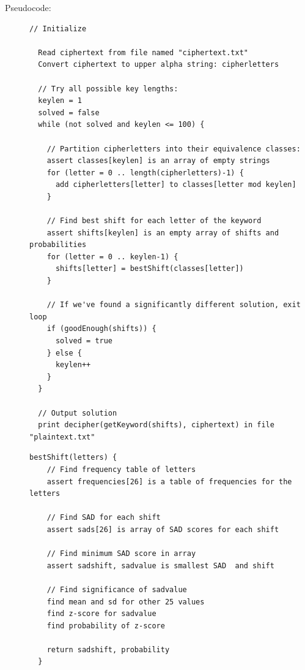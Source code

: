 \documentclass{article}
\begin{document}
\begin{description}
  \newpage
  
\item[Pseudocode:]\mbox{}

\begin{Verbatim}[frame=single,label=Vigenere main]
  // Initialize

  Read ciphertext from file named "ciphertext.txt"
  Convert ciphertext to upper alpha string: cipherletters
  
  // Try all possible key lengths:
  keylen = 1
  solved = false
  while (not solved and keylen <= 100) {
    
    // Partition cipherletters into their equivalence classes:
    assert classes[keylen] is an array of empty strings
    for (letter = 0 .. length(cipherletters)-1) {
      add cipherletters[letter] to classes[letter mod keylen]
    }
    
    // Find best shift for each letter of the keyword
    assert shifts[keylen] is an empty array of shifts and probabilities
    for (letter = 0 .. keylen-1) {
      shifts[letter] = bestShift(classes[letter])
    }
    
    // If we've found a significantly different solution, exit loop
    if (goodEnough(shifts)) {
      solved = true
    } else {
      keylen++
    }
  }

  // Output solution
  print decipher(getKeyword(shifts), ciphertext) in file "plaintext.txt"
\end{Verbatim}


\begin{Verbatim}[frame=single,label=bestShift]
  bestShift(letters) {
    // Find frequency table of letters
    assert frequencies[26] is a table of frequencies for the letters
    
    // Find SAD for each shift
    assert sads[26] is array of SAD scores for each shift

    // Find minimum SAD score in array
    assert sadshift, sadvalue is smallest SAD  and shift

    // Find significance of sadvalue
    find mean and sd for other 25 values
    find z-score for sadvalue
    find probability of z-score

    return sadshift, probability
  }  
\end{Verbatim}

\end{description}
\end{document}
